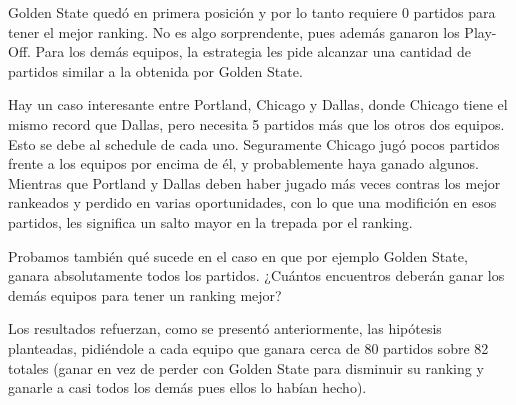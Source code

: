 Golden State qued\'o en primera posici\'on y por lo tanto requiere 0 partidos para tener el mejor ranking. No es algo sorprendente, pues adem\'as ganaron los Play-Off. Para los dem\'as equipos, la estrategia les pide alcanzar una cantidad de partidos similar a la obtenida por Golden State.

Hay un caso interesante entre Portland, Chicago y Dallas, donde Chicago tiene el mismo record que Dallas, pero necesita 5 partidos m\'as que los otros dos equipos. Esto se debe al schedule de cada uno. Seguramente Chicago jug\'o pocos partidos frente a los equipos por encima de \'el, y probablemente haya ganado algunos. Mientras que Portland y Dallas deben haber jugado m\'as veces contras los mejor rankeados y perdido en varias oportunidades, con lo que una modifici\'on en esos partidos, les significa un salto mayor en la trepada por el ranking.

Probamos tambi\'en qu\'e sucede en el caso en que por ejemplo Golden State, ganara absolutamente todos los partidos. ¿Cu\'antos encuentros deber\'an ganar los dem\'as equipos para tener un ranking mejor?

Los resultados refuerzan, como se present\'o anteriormente, las hip\'otesis planteadas, pidi\'endole a cada equipo que ganara cerca de 80 partidos sobre 82 totales (ganar en vez de perder con Golden State para disminuir su ranking y ganarle a casi todos los dem\'as pues ellos lo hab\'ian hecho).
